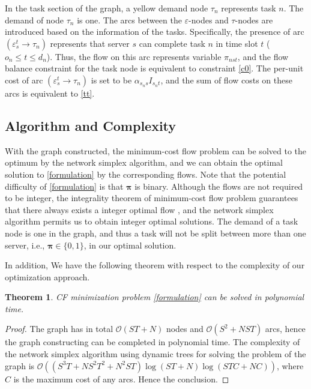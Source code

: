 \documentclass[conference, 10pt, ﬁnal, letterpaper, twocolumn]{IEEEtran}
\newtheorem{theorem}{Theorem}
\begin{document}
In the task section of the graph, a yellow demand node $\tau_n$ represents task $n$. The demand of node $\tau_n$ is one. The arcs between the $\varepsilon$-nodes and $\tau$-nodes are introduced based on the information of the tasks. Specifically, the presence of arc $(\varepsilon^{t}_{s}\rightarrow\tau_{n})$ represents that server $s$ can complete task $n$ in time slot $t$ ($o_n \leq t \leq d_n$). Thus, the flow on this arc represents variable $\pi_{nst}$, and the flow balance constraint for the task node is equivalent to constraint \eqref{c0}.
The per-unit cost of arc $(\varepsilon^{t}_{s}\rightarrow\tau_n)$ is set to be $\alpha_{s_{n}s}I_{s_{n}t}$, and the sum of flow costs on these arcs is equivalent to \eqref{tt}.



\subsection{Algorithm and Complexity}

With the graph constructed, the minimum-cost flow problem can be solved to the optimum by the network simplex algorithm\cite{10.5555/137406}, and we can obtain the optimal solution to \eqref{formulation} by the corresponding flows. Note that the potential difficulty of \eqref{formulation} is that $\boldsymbol{\pi}$ is binary. Although the flows are not required to be integer, the integrality theorem of minimum-cost flow problem guarantees that there always exists a integer optimal flow \cite[Theorem 11.5]{10.5555/137406}, and the network simplex algorithm permits us to obtain integer optimal solutions. The demand of a task node is one in the graph, and thus a task will not be split between more than one server, i.e., $\boldsymbol{\pi} \in \{0,1\}$, in our optimal solution.

In addition, We have the following theorem with respect to the complexity of our optimization approach.

\begin{theorem}
CF minimization problem \eqref{formulation} can be solved in polynomial time.
\end{theorem}
\begin{proof}
The graph has in total $\mathcal{O}(ST + N)$ nodes and $\mathcal{O}(S^2 + NST)$ arcs, hence the graph constructing can be completed in polynomial time. The complexity of the network simplex algorithm using dynamic trees \cite{tarjan1997dynamic} for solving the problem of the graph is $\mathcal{O}((S^3T + NS^2 T^2+N^2ST)\log(ST + N)\log(STC + NC))$, where $C$ is the maximum cost of any arcs. Hence the conclusion.
\end{proof}
\end{document}

